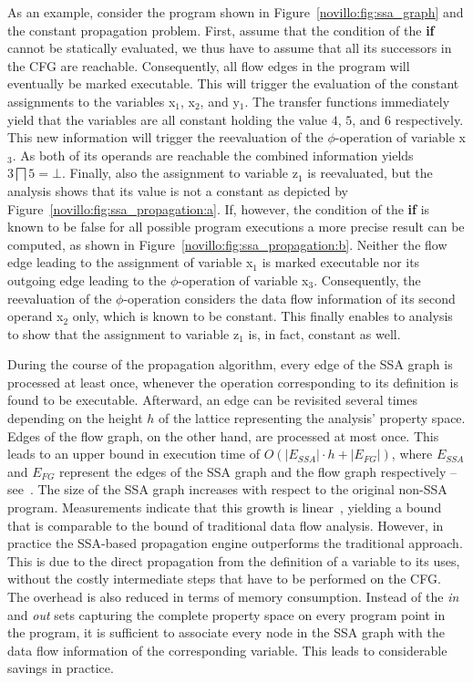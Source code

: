 As an example, consider the program shown in Figure~\ref{novillo:fig:ssa_graph}
and the constant propagation problem. First,
assume that the condition of the \textbf{if} cannot be statically evaluated, we
thus have to assume that all its successors in the CFG are reachable.
Consequently, all flow edges in the program will eventually be marked
executable. This will trigger the evaluation of the constant assignments to
the variables x$_1$,  x$_2$, and y$_1$. The transfer functions immediately yield
that the variables are all constant holding the value $4$, $5$, and $6$
respectively. This new information will trigger the reevaluation of the
$\phi$-operation of variable x$_3$. As both of its operands are reachable the
combined information yields $3 \bigsqcap 5 = \bot$. Finally, also the assignment
to variable z$_1$ is reevaluated, but the analysis shows that its value is not a
constant as depicted by Figure~\ref{novillo:fig:ssa_propagation:a}. If, however,
the condition of the \textbf{if} is known to be false for all possible program
executions a more precise result can be computed, as shown in
Figure~\ref{novillo:fig:ssa_propagation:b}. Neither the flow edge leading to the
assignment of variable x$_1$ is marked executable nor its outgoing edge leading
to the $\phi$-operation of variable x$_3$. Consequently, the reevaluation of
the $\phi$-operation considers the data flow information of its second operand
x$_2$ only, which is known to be constant. This finally enables to analysis
to show that the assignment to variable z$_1$ is, in fact, constant as well.

During the course of the propagation algorithm, every edge of the SSA graph is
processed at least once, whenever the operation corresponding to its definition
is found to be executable. Afterward, an edge can be revisited several times
depending on the height $h$ of the lattice representing the analysis' property
space. Edges of the flow graph, on the other hand, are processed at most once.
This leads to an upper bound in execution time of $O(|E_{SSA}| \cdot h +
|E_{FG}|)$, where $E_{SSA}$ and $E_{FG}$ represent the edges of the SSA graph
and the flow graph respectively -- see~\cite{bib:wegman.ea-91}. The size of the
SSA graph increases with respect to the original non-SSA program. Measurements
indicate that this growth is linear~\cite{novillo:bib:cytron.ea-91}, yielding a
bound that is comparable to the bound of traditional data flow analysis.
However, in practice the SSA-based propagation engine outperforms the
traditional approach. This is  due to the direct propagation from the definition
of a variable to its uses, without the costly intermediate steps that have to be
performed on the CFG. The overhead is also reduced in terms of memory
consumption. Instead of the \emph{in} and \emph{out} sets capturing the complete
property space on every program point in the program, it is sufficient to
associate every node in the SSA graph with the data flow information of the
corresponding variable. This leads to considerable savings in practice.

